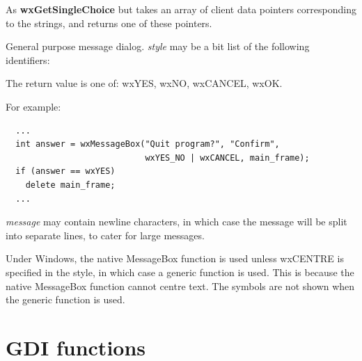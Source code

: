 As {\bf wxGetSingleChoice} but takes an array of client data pointers
corresponding to the strings, and returns one of these pointers.

\label{wxmessagebox}


General purpose message dialog.  {\it style} may be a bit list of the
following identifiers:

\begin{twocollist}\itemsep=0pt
\end{twocollist}

The return value is one of: wxYES, wxNO, wxCANCEL, wxOK.

For example:

\begin{verbatim}
  ...
  int answer = wxMessageBox("Quit program?", "Confirm",
                            wxYES_NO | wxCANCEL, main_frame);
  if (answer == wxYES)
    delete main_frame;
  ...
\end{verbatim}

{\it message} may contain newline characters, in which case the
message will be split into separate lines, to cater for large messages.

Under Windows, the native MessageBox function is used unless wxCENTRE
is specified in the style, in which case a generic function is used.
This is because the native MessageBox function cannot centre text.
The symbols are not shown when the generic function is used.

\section{GDI functions}\label{gdifunctions}

